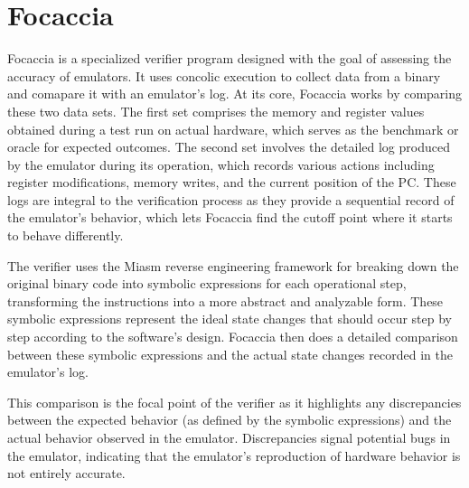 \section{Focaccia}
Focaccia is a specialized verifier program designed with the goal of assessing the accuracy of emulators.
It uses concolic execution to collect data from a binary and comapare it with an emulator's log.
At its core, Focaccia works by comparing these two data sets.
The first set comprises the memory and register values obtained during a test run on actual hardware, which serves as the benchmark or oracle for expected outcomes. 
The second set involves the detailed log produced by the emulator during its operation, which records various actions including register modifications, memory writes, and the current position of the \ac{PC}.
These logs are integral to the verification process as they provide a sequential record of the emulator's behavior, which lets Focaccia find the cutoff point where it starts to behave differently.

The verifier uses the Miasm \cite{desclaux2012miasm} reverse engineering framework for breaking down the original binary code into symbolic expressions for each operational step, transforming the instructions into a more abstract and analyzable form.
These symbolic expressions represent the ideal state changes that should occur step by step according to the software's design.
Focaccia then does a detailed comparison between these  symbolic expressions and the actual state changes recorded in the emulator's log.

This comparison is the focal point of the verifier as it highlights any discrepancies between the expected behavior (as defined by the symbolic expressions) and the actual behavior observed in the emulator.
Discrepancies signal potential bugs in the emulator, indicating that the emulator's reproduction of hardware behavior is not entirely accurate.


